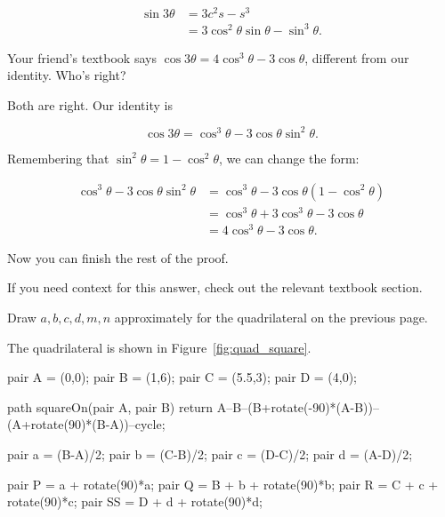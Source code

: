 \documentclass[../key.tex]{subfiles}
\begin{document}
\begin{align*}
\sin 3\theta &= 3c^2 s - s^3 \\
&= 3\cos^2\theta\sin\theta - \sin^3\theta.
\end{align*}

\begin{outer_problem}
\item Your friend's textbook says $\cos 3\theta = 4\cos^3\theta - 3\cos \theta$, different from our identity. Who's right?
\end{outer_problem}

Both are right. Our identity is

$$\cos 3\theta = \cos^3\theta - 3\cos\theta\sin^2\theta.$$

Remembering that $\sin^2\theta = 1-\cos^2\theta$, we can change the form:

\begin{align*}
\cos^3\theta - 3\cos\theta\sin^2\theta &= \cos^3\theta - 3\cos\theta(1-\cos^2\theta) \\
&= \cos^3\theta + 3\cos^3\theta - 3\cos\theta \\
&= 4\cos^3\theta - 3\cos\theta.
\end{align*}

\begin{outer_problem}
\item Now you can finish the rest of the proof.
\end{outer_problem}

If you need context for this answer, check out the relevant textbook section.

\begin{inner_problem}[start=1]
\item Draw $a,b,c,d,m,n$ approximately for the quadrilateral on the previous page.
\end{inner_problem}

The quadrilateral is shown in Figure~\ref{fig:quad_square}.

\begin{asydef}
pair A = (0,0);
pair B = (1,6);
pair C = (5.5,3);
pair D = (4,0);

path squareOn(pair A, pair B) {
	return A--B--(B+rotate(-90)*(A-B))--(A+rotate(90)*(B-A))--cycle;
}

pair a = (B-A)/2;
pair b = (C-B)/2;
pair c = (D-C)/2;
pair d = (A-D)/2;

pair P = a + rotate(90)*a;
pair Q = B + b + rotate(90)*b;
pair R = C + c + rotate(90)*c;
pair SS = D + d + rotate(90)*d;
\end{asydef}
\end{document}
